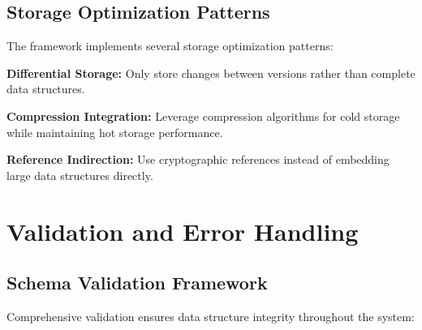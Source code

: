 \documentclass[12pt,a4paper]{article}
\begin{document}
\subsection{Storage Optimization Patterns}

The framework implements several storage optimization patterns:

\textbf{Differential Storage:} Only store changes between versions rather than complete data structures.

\textbf{Compression Integration:} Leverage compression algorithms for cold storage while maintaining hot storage performance.

\textbf{Reference Indirection:} Use cryptographic references instead of embedding large data structures directly.

\section{Validation and Error Handling}

\subsection{Schema Validation Framework}

Comprehensive validation ensures data structure integrity throughout the system:
\end{document}
